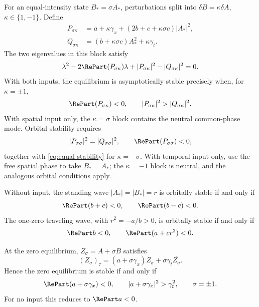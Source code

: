 For an equal-intensity state $B_*=\sigma A_*$, perturbations split into
$\delta B=\kappa\delta A$, $\kappa\in\{1,-1\}$.  Define
\begin{align}
 P_{\sigma\kappa}
 &=a+\kappa\gamma_x
 +(2b+c+\kappa\sigma c)|A_*|^2,
 \label{eq:equal-P}\\
 Q_{\sigma\kappa}
 &=(b+\kappa\sigma c)A_*^2+\kappa\gamma_t.
 \label{eq:equal-Q}
\end{align}
The two eigenvalues in this block satisfy
\begin{equation}
 \lambda^2-2\RePart(P_{\sigma\kappa})\lambda
 +|P_{\sigma\kappa}|^2-|Q_{\sigma\kappa}|^2=0.
 \label{eq:equal-characteristic}
\end{equation}
With both inputs, the equilibrium is asymptotically stable precisely when,
for $\kappa=\pm1$,
\begin{equation}
 \RePart(P_{\sigma\kappa})<0,
 \qquad
 |P_{\sigma\kappa}|^2>|Q_{\sigma\kappa}|^2.
 \label{eq:equal-stability}
\end{equation}
With spatial input only, the $\kappa=\sigma$ block contains the neutral
common-phase mode.  Orbital stability requires
\begin{equation}
 |P_{\sigma\sigma}|^2=|Q_{\sigma\sigma}|^2,
 \qquad \RePart(P_{\sigma\sigma})<0,
 \label{eq:spatial-orbital}
\end{equation}
together with \eqref{eq:equal-stability} for $\kappa=-\sigma$.  With
temporal input only, use the free spatial phase to take $B_*=A_*$; the
$\kappa=-1$ block is neutral, and the analogous orbital conditions apply.

Without input, the standing wave $|A_*|=|B_*|=r$ is orbitally stable if and
only if
\begin{equation}
 \RePart(b+c)<0,
 \qquad \RePart(b-c)<0.
 \label{eq:unforced-standing-stability}
\end{equation}
The one-zero traveling wave, with $r^2=-a/b>0$, is orbitally stable if and
only if
\begin{equation}
 \RePart b<0,
 \qquad \RePart(a+cr^2)<0.
 \label{eq:unforced-traveling-stability}
\end{equation}

At the zero equilibrium, $Z_\sigma=A+\sigma B$ satisfies
\begin{equation}
 (Z_\sigma)_\tau=(a+\sigma\gamma_x)Z_\sigma
 +\sigma\gamma_t\overline{Z_\sigma}.
 \label{eq:zero-parity}
\end{equation}
Hence the zero equilibrium is stable if and only if
\begin{equation}
 \RePart(a+\sigma\gamma_x)<0,
 \qquad
 |a+\sigma\gamma_x|^2>\gamma_t^2,
 \qquad \sigma=\pm1.
 \label{eq:zero-stability}
\end{equation}
For no input this reduces to $\RePart a<0$.

